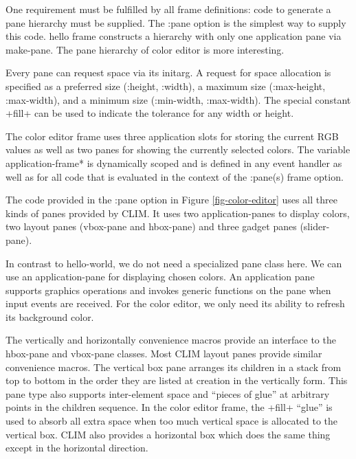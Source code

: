 \documentclass[twocolumn,a4paper]{article}
\newcommand {\code}[1]{{\sffamily #1}}
\newcommand {\CLIM}{{\small CLIM}}
\let\class\code
\let\method\code
\let\constant\code
\let\variable\code
\let\macro\code
\let\keyword\code
\begin{document}
One requirement must be fulfilled by all frame definitions: code to
generate a pane hierarchy must be supplied. The \keyword{:pane} option
is the simplest way to supply this code. \class{hello frame}
constructs a hierarchy with only one application pane via
\method{make-pane}. The pane hierarchy of color editor is more
interesting.

Every pane can request space via its initarg. A request for space
allocation is specified as a preferred size (\keyword{:height},
\keyword{:width}), a maximum size (\keyword{:max-height},
\keyword{:max-width}), and a minimum size (\keyword{:min-width},
\keyword{:max-width}). The special constant \constant{+fill+} can be
used to indicate the tolerance for any width or height.

The color editor frame uses three application slots for storing the
current RGB values as well as two panes for showing the currently
selected colors. The variable \variable{*application-frame*} is
dynamically scoped and is defined in any event handler as well as for
all code that is evaluated in the context of the \keyword{:pane(s)}
frame option.

\begin{figure*} \lstset{style=framestyle}

\caption{Color Editor}\label{fig-color-editor}
\end{figure*}

The code provided in the \keyword{:pane} option in Figure
\ref{fig-color-editor} uses all three kinds of panes provided by
\CLIM{}. It uses two application-panes to display colors, two layout
panes (\class{vbox-pane} and \class{hbox-pane}) and three gadget panes
(\class{slider-pane}).

In contrast to \class{hello-world}, we do not need a specialized pane
class here. We can use an application-pane for displaying chosen
colors.  An application pane supports graphics operations and invokes
generic functions on the pane when input events are received. For the
color editor, we only need its ability to refresh its background
color.

The \macro{vertically} and \macro{horizontally} convenience macros
provide an interface to the \class{hbox-pane} and \class{vbox-pane}
classes. Most \CLIM{} layout panes provide similar convenience
macros. The vertical box pane arranges its children in a stack from
top to bottom in the order they are listed at creation in the
vertically form. This pane type also supports inter-element space and
``pieces of glue'' at arbitrary points in the children sequence. In
the color editor frame, the \constant{+fill+} ``glue'' is used to
absorb all extra space when too much vertical space is allocated to
the vertical box. \CLIM{} also provides a horizontal box which does
the same thing except in the horizontal direction.
\end{document}
